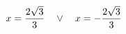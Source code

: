 \documentclass[preview]{standalone}
\begin{document}
\begin{align*}
\special{dvisvgm:raw <g id='unique000'>}x=\frac{2 \sqrt{3}}{3} \quad \lor \quad x=- \frac{2 \sqrt{3}}{3}\special{dvisvgm:raw </g>}
\end{align*}
\end{document}

